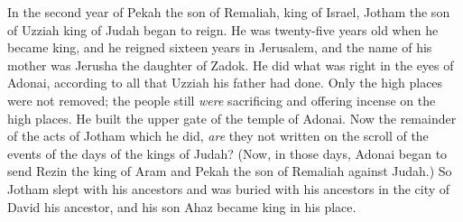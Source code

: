 \begin{biblechapter}
 In the second year of Pekah the son of Remaliah, king of Israel, Jotham the son of Uzziah king of Judah began to reign.
\verse He was twenty-five years old when he became king, and he reigned sixteen years in Jerusalem, and the name of his mother was Jerusha the daughter of Zadok.
\verse He did what was right in the eyes of Adonai, according to all that Uzziah his father had done.
\verse Only the high places were not removed; the people still \textit{were} sacrificing and offering incense on the high places. He built the upper gate of the temple of Adonai.
\verse Now the remainder of the acts of Jotham which he did, \textit{are} they not written on the scroll of the events of the days of the kings of Judah?
\verse (Now, in those days, Adonai began to send Rezin the king of Aram and Pekah the son of Remaliah against Judah.)
\verse So Jotham slept with his ancestors and was buried with his ancestors in the city of David his ancestor, and his son Ahaz became king in his place.
\end{biblechapter}

